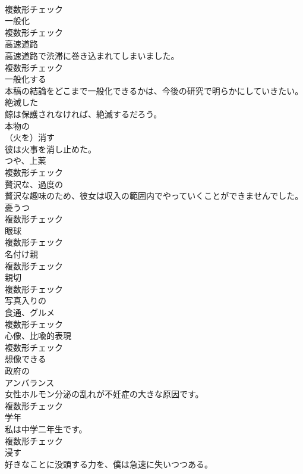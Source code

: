 \documentclass[8pt]{extreport}
\begin{document}
\begin{CJK}{UTF8}{min}
\\	複数形チェック
\\	[名詞]	一般化	
\\	複数形チェック
\\	[名詞]	高速道路	
\\	高速道路で渋滞に巻き込まれてしまいました。	
\\	複数形チェック
\\	[動詞]	一般化する	
\\	本稿の結論をどこまで一般化できるかは、今後の研究で明らかにしていきたい。	
\\	[形容詞]	絶滅した	
\\	鯨は保護されなければ、絶滅するだろう。	
\\	[副詞]	本物の	
\\	[動詞]	（火を）消す	
\\	彼は火事を消し止めた。	
\\	[名詞]	つや、上薬	
\\	複数形チェック
\\	[形容詞]	贅沢な、過度の	
\\	贅沢な趣味のため、彼女は収入の範囲内でやっていくことができませんでした。	
\\	[名詞]	憂うつ	
\\	複数形チェック
\\	[名詞]	眼球	
\\	複数形チェック
\\	[名詞]	名付け親	
\\	複数形チェック
\\	[名詞]	親切	
\\	複数形チェック
\\	[形容詞]	写真入りの	
\\	[名詞]	食通、グルメ	
\\	複数形チェック
\\	[名詞]	心像、比喩的表現	
\\	複数形チェック
\\	[形容詞]	想像できる	
\\	[形容詞]	政府の	
\\	[名詞]	アンバランス	
\\	女性ホルモン分泌の乱れが不妊症の大きな原因です。	
\\	複数形チェック
\\	[名詞]	学年	
\\	私は中学二年生です。	
\\	複数形チェック
\\	[動詞]	浸す	
\\	好きなことに没頭する力を、僕は急速に失いつつある。	

\end{CJK}
\end{document}
